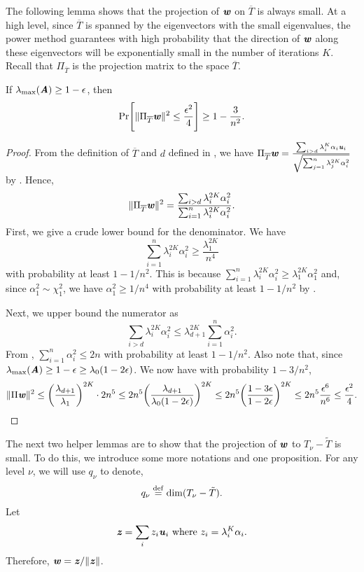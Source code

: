 The following lemma shows that the projection of $\ww$ on $\overline{T}$ is always small. At a high level, 
since $\overline{T}$ is spanned by the eigenvectors with the small eigenvalues, the power method guarantees with high probability that the direction of $\ww$ along these eigenvectors will be exponentially small in the number of iterations $K$.
Recall that $\Pi_{\overline{T}}$ is the projection matrix to the space $\overline{T}$.
\begin{lemma}\label{lem:boundLowEV}
If $\lambda_{\max}(\AA)\geq 1-\epsilon$, then
\[
\Pr\left[\|\Pi_{\overline{T}}\ww\|^2 \leq \frac{\epsilon^2}{4}\right]\geq 1 - \frac{3}{n^2}.
\]
\end{lemma}
\begin{proof}
From the definition of $\overline{T}$ and $d$ defined in , we have $\Pi_{\overline{T}}\ww = \frac{\sum_{i>d} \lambda_i^{K}\alpha_i\uu_i}{\sqrt{\sum_{j=1}^n \lambda_j^{2K}\alpha_i^2}}$ by . Hence,  
\[
\|\Pi_{\overline{T}}\ww\|^2 = \frac{\sum_{i>d}\lambda_i^{2K}\alpha_i^2}{\sum_{i=1}^n\lambda_i^{2K}\alpha_i^2}.
\]
First, we give a crude lower bound for the denominator. We have $$\sum_{i=1}^n\lambda_i^{2K}\alpha_i^2 \geq \frac{\lambda_1^{2K}}{n^4}$$ with probability at least $1-1/n^{2}$. This is because $\sum_{i=1}^n\lambda_i^{2K}\alpha_i^2 \geq \lambda_1^{2K}\alpha_1^2$ and,  since $\alpha_1^2 \sim \chi^2_1$,  we have $\alpha_1^2 \geq 1/n^4$ with probability at least $1-1/n^{2}$ by .

Next, we upper bound the numerator as 
\[
\sum_{i>d}\lambda_i^{2K}\alpha_i^2 \leq \lambda_{d+1}^{2K}\sum_{i=1}^n\alpha_i^2.
\]
From , $\sum_{i=1}^n\alpha_i^2 \leq 2 n$ with probability at least $1-1/n^2$. Also note that, since $\lambda_{\max}(\AA)\geq 1-\epsilon \geq \lambda_0 (1-2\epsilon)$. We now have with probability $1-3/n^2$,
\[
\|\Pi\ww\|^2 \leq \left(\frac{\lambda_{d+1}}{\lambda_1}\right)^{2K}\cdot 2n^5 \leq  2n^5\left(\frac{\lambda_{d+1}}{\lambda_0 (1-2\epsilon)}\right)^{2K} \leq 2 n^5 \left(\frac{1-3\epsilon}{1-2\epsilon}\right)^{2K} \leq 2 n^5 \frac{\epsilon^6}{n^6}\leq \frac{\epsilon^2}{4}.\qedhere
\]
\end{proof}


The next two helper lemmas are to show that the projection of $\ww$ to $T_{\nu}- \tilde{T}$ is small. To do this, we introduce some more notations and one proposition. 
For any level $\nu$, we will use $q_{\nu}$ to denote,
\begin{equation}
    q_{\nu} \defeq \dim{T_{\nu}-\tilde{T}}.
\end{equation}
Let 
\begin{equation}\label{def:z}
\zz=\sum_{i}z_{i}\uu_{i}\text{ where }z_{i}=\lambda_{i}^{K}\alpha_{i}.
\end{equation} 
Therefore, $\ww=\zz/\|\zz\|$.

